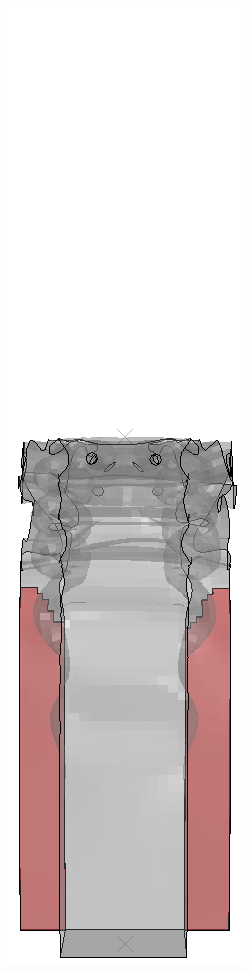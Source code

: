 \documentclass[
documentsize = a4, %
font = cmr, %
typesize = 11, %
printmode = true,
onehalfspacing = true,
language = en, %
titlepage = udciccp, %
degree = pt, %
dedication = true,
acknowledgements = true,
abstract-en = true,
abstract-es = false,
abstract-ga = false,
epigraphs = true,
toc = true,
lof = true,
lot = true,
frontmatterintoc = false,
notation = false,
minimal = false,
]{UDCthesis}
\begin{document}
\begin{figure}
\begin{minipage}[b]{.06\linewidth}
	\end{minipage}
	\quad
	\begin{minipage}[b]{.06\linewidth}
		\centering
		\includegraphics[width=\linewidth]{IMG_CUTRES/a9}

\end{minipage}
\end{figure}
\end{document}
